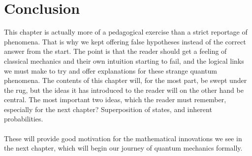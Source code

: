 \section{Conclusion}
This chapter is actually more of a pedagogical exercise than a strict reportage of phenomena. That is why we kept offering false hypotheses instead of the correct answer from the start. The point is that the reader should get a feeling of classical mechanics and their own intuition starting to fail, and the logical links we must make to try and offer explanations for these strange quantum phenomena. The contents of this chapter will, for the most part, be swept under the rug, but the ideas it has introduced to the reader will on the other hand be central. The most important two ideas, which the reader must remember, especially for the next chapter? Superposition of states, and inherent probabilities.
\\\\
These will provide good motivation for the mathematical innovations we see in the next chapter, which will begin our journey of quantum mechanics formally.